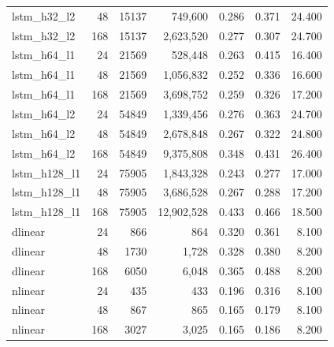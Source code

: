 \begin{table}[htbp]
\begin{tabular}{lrrrrrr}
lstm\_h32\_l2 & 48 & 15137 & 749,600 & 0.286 & 0.371 & 24.400 \\
lstm\_h32\_l2 & 168 & 15137 & 2,623,520 & 0.277 & 0.307 & 24.700 \\
lstm\_h64\_l1 & 24 & 21569 & 528,448 & 0.263 & 0.415 & 16.400 \\
lstm\_h64\_l1 & 48 & 21569 & 1,056,832 & 0.252 & 0.336 & 16.600 \\
lstm\_h64\_l1 & 168 & 21569 & 3,698,752 & 0.259 & 0.326 & 17.200 \\
lstm\_h64\_l2 & 24 & 54849 & 1,339,456 & 0.276 & 0.363 & 24.700 \\
lstm\_h64\_l2 & 48 & 54849 & 2,678,848 & 0.267 & 0.322 & 24.800 \\
lstm\_h64\_l2 & 168 & 54849 & 9,375,808 & 0.348 & 0.431 & 26.400 \\
lstm\_h128\_l1 & 24 & 75905 & 1,843,328 & 0.243 & 0.277 & 17.000 \\
lstm\_h128\_l1 & 48 & 75905 & 3,686,528 & 0.267 & 0.288 & 17.200 \\
lstm\_h128\_l1 & 168 & 75905 & 12,902,528 & 0.433 & 0.466 & 18.500 \\
dlinear & 24 & 866 & 864 & 0.320 & 0.361 & 8.100 \\
dlinear & 48 & 1730 & 1,728 & 0.328 & 0.380 & 8.200 \\
dlinear & 168 & 6050 & 6,048 & 0.365 & 0.488 & 8.200 \\
nlinear & 24 & 435 & 433 & 0.196 & 0.316 & 8.100 \\
nlinear & 48 & 867 & 865 & 0.165 & 0.179 & 8.100 \\
nlinear & 168 & 3027 & 3,025 & 0.165 & 0.186 & 8.200 \\
\bottomrule
\end{tabular}
\end{table}
